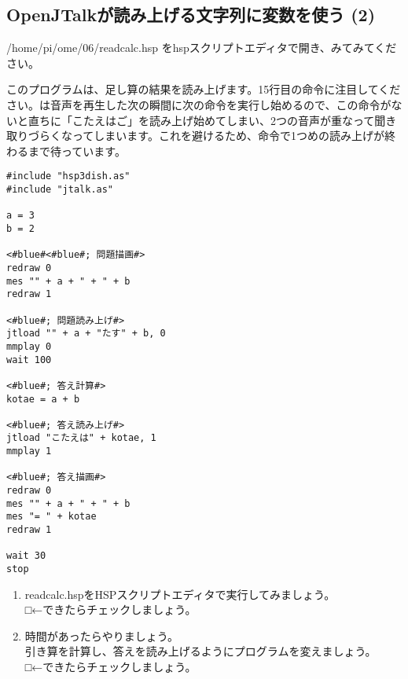 \subsection{OpenJTalkが読み上げる文字列に変数を使う (2)}
/home/pi/ome/06/readcalc.hsp をhspスクリプトエディタで開き、みてみてください。

このプログラムは、足し算の結果を読み上げます。15行目の命令に注目してください。は音声を再生した次の瞬間に次の命令を実行し始めるので、この命令がないと直ちに「こたえはご」を読み上げ始めてしまい、2つの音声が重なって聞き取りづらくなってしまいます。これを避けるため、命令で1つめの読み上げが終わるまで待っています。\\

\begin{lstlisting}[caption=readcalc.hsp,label=readcalc.hsp]
#include "hsp3dish.as"
#include "jtalk.as"

a = 3
b = 2

<#blue#<#blue#; 問題描画#>
redraw 0
mes "" + a + " + " + b
redraw 1

<#blue#; 問題読み上げ#>
jtload "" + a + "たす" + b, 0
mmplay 0
wait 100

<#blue#; 答え計算#>
kotae = a + b

<#blue#; 答え読み上げ#>
jtload "こたえは" + kotae, 1
mmplay 1

<#blue#; 答え描画#>
redraw 0
mes "" + a + " + " + b
mes "= " + kotae
redraw 1

wait 30
stop
\end{lstlisting}

\begin{tcolorbox}[title=\useOmetoi]
\begin{enumerate}
\item readcalc.hspをHSPスクリプトエディタで実行してみましょう。\\□←できたらチェックしましょう。
\item 時間があったらやりましょう。\\引き算を計算し、答えを読み上げるようにプログラムを変えましょう。\\□←できたらチェックしましょう。
\end{enumerate}
\end{tcolorbox}
